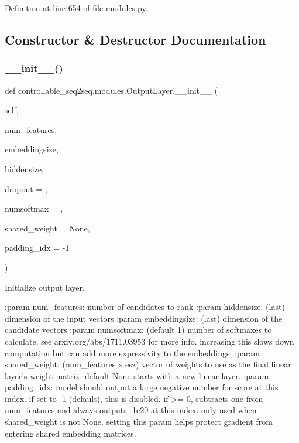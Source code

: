 Definition at line 654 of file modules.\+py.



\subsection{Constructor \& Destructor Documentation}
\mbox{\label{classcontrollable__seq2seq_1_1modules_1_1OutputLayer_a4c3d42775e8cdc7be2418ebce2b7c520}} 
\subsubsection{\texorpdfstring{\+\_\+\+\_\+init\+\_\+\+\_\+()}{\_\_init\_\_()}}
{\footnotesize\ttfamily def controllable\+\_\+seq2seq.\+modules.\+Output\+Layer.\+\_\+\+\_\+init\+\_\+\+\_\+ (\begin{DoxyParamCaption}\item[{}]{self,  }\item[{}]{num\+\_\+features,  }\item[{}]{embeddingsize,  }\item[{}]{hiddensize,  }\item[{}]{dropout = {},  }\item[{}]{numsoftmax = {},  }\item[{}]{shared\+\_\+weight = {\ttfamily None},  }\item[{}]{padding\+\_\+idx = {\ttfamily -\/1} }\end{DoxyParamCaption})}

\begin{DoxyVerb}Initialize output layer.

:param num_features:  number of candidates to rank
:param hiddensize:    (last) dimension of the input vectors
:param embeddingsize: (last) dimension of the candidate vectors
:param numsoftmax:   (default 1) number of softmaxes to calculate.
              see arxiv.org/abs/1711.03953 for more info.
              increasing this slows down computation but can
              add more expressivity to the embeddings.
:param shared_weight: (num_features x esz) vector of weights to use as
              the final linear layer's weight matrix. default
              None starts with a new linear layer.
:param padding_idx:   model should output a large negative number for
              score at this index. if set to -1 (default),
              this is disabled. if >= 0, subtracts one from
              num_features and always outputs -1e20 at this
              index. only used when shared_weight is not None.
              setting this param helps protect gradient from
              entering shared embedding matrices.
\end{DoxyVerb}
 

